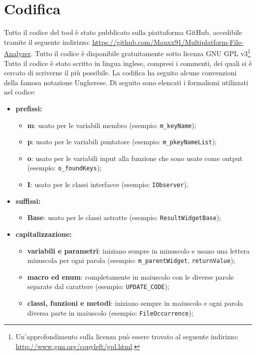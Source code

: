 \section{Codifica}
Tutto il codice del tool è stato pubblicato sulla piattaforma GitHub, accedibile tramite il seguente indirizzo: \url{https://github.com/Mauxx91/Multiplatform-File-Analyzer}. Tutto il codice è disponibile gratuitamente sotto licenza GNU GPL v3\footnote{Un'approfondimento sulla licenza può essere trovato al seguente indirizzo: \url{http://www.gnu.org/copyleft/gpl.html}.}\\

Tutto il codice è stato scritto in lingua inglese, compresi i commenti, dei quali si è cercato di scriverne il più possibile.
La codifica ha seguito alcune convenzioni della famosa notazione Ungherese. Di seguito sono elencati i formalismi utilizzati nel codice:

\begin{itemize}
	\item \textbf{prefissi:}
	\begin{itemize}
		\item \textbf{m}: usato per le variabili membro (esempio: \texttt{m\_keyName});
		\item \textbf{p}: usato per le variabili puntatore (esempio: \texttt{m\_pkeyNameList});
		\item \textbf{o}: usato per le variabili input alla funzione che sono usate come output (esempio: \texttt{o\_foundKeys});
		\item \textbf{I}: usato per le classi interfacce (esempio: \texttt{IObserver}).
	\end{itemize}
	\item \textbf{suffissi:}
	\begin{itemize}
		\item \textbf{Base}: usato per le classi astratte (esempio: \texttt{ResultWidgetBase});
	\end{itemize}
	\item \textbf{capitalizzazione:}
	\begin{itemize}
		\item \textbf{variabili e parametri}: iniziano sempre in minuscolo e usano una lettera minuscola per ogni parola (esempio: \texttt{m\_parentWidget}, \texttt{returnValue});
		\item \textbf{macro ed enum}: completamente in maiuscolo con le diverse parole separate dal carattere \sq{\_} (esempio: \texttt{UPDATE\_CODE});
		\item \textbf{classi, funzioni e metodi}: iniziano sempre in maiuscolo e ogni parola diversa parte in maiuscolo (esempio: \texttt{FileOccurrence});
	\end{itemize}
\end{itemize}

